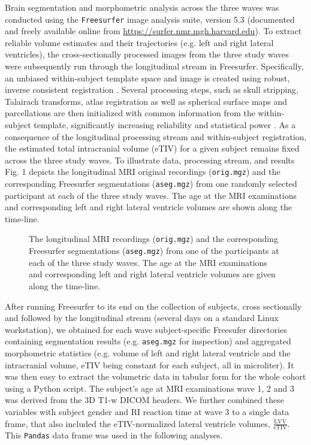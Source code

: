 \documentclass[10pt,letterpaper]{article}
\begin{document}
Brain segmentation and morphometric analysis across the three waves
was conducted using the {\tt Freesurfer} image analysis suite, version 5.3 (documented and freely available online from {\small \url{https://surfer.nmr.mgh.harvard.edu}}).
To extract reliable volume estimates and their trajectories (e.g. left and right lateral ventricles), the cross-sectionally processed images from the three study waves were subsequently run through the longitudinal stream \cite{Reuter2012} in Freesurfer.
Specifically, an unbiased within-subject template space and image is created using robust, inverse consistent registration \cite{Reuter2010}. 
Several processing steps, such as skull stripping, Talairach transforms, atlas registration as well as spherical surface maps and parcellations are then initialized with common information from the within-subject template, significantly increasing reliability and statistical power \cite{Reuter2012}. 
As a consequence of the longitudinal processing stream and within-subject registration, the estimated total intracranial volume (eTIV) for a given subject remains fixed across the three study waves. 
To illustrate data, processing stream, and results Fig. 1 depicts the longitudinal MRI original 
recordings ({\tt orig.mgz}) and the corresponding Freesurfer segmentations ({\tt aseg.mgz}) from one randomly selected participant at each of the three study waves. The age at the MRI examinations and corresponding left and right lateral ventricle volumes are shown along the time-line.

\vspace{3mm}


\begin{figure}[H]
\caption{
The longitudinal MRI recordings ({\tt orig.mgz}) and the corresponding Freesurfer segmentations ({\tt aseg.mgz}) from one of the participants at each of the three study waves. The age at the MRI examinations and corresponding left and right lateral ventricle volumes are given along the time-line.}
\label{fig 1}
\end{figure}


\vspace{3mm}


After running Freesurfer to its end on the collection of subjects, cross sectionally and followed by the longitudinal stream (several days on a standard Linux workstation), we obtained for each wave subject-specific Freesufer directories containing segmentation results (e.g. {\tt aseg.mgz} for inspection) and aggregated morphometric statistics (e.g. volume of left and right lateral ventricle and the intracranial volume, eTIV being constant for each subject, all in microliter). It was then easy to extract the volumetric data in tabular form for the whole cohort using a Python script. The subject's age at MRI examinations wave 1, 2 and 3 was derived from the 3D T1-w DICOM headers.
We further combined these variables with subject gender and RI reaction time at wave 3 to a single data frame, that also included the eTIV-normalized lateral ventricle volumes, $\frac{\mbox{LVV}}{\mbox{eTIV}}$. 
This {\tt Pandas} data frame was used in the following analyses.\\
\end{document}

